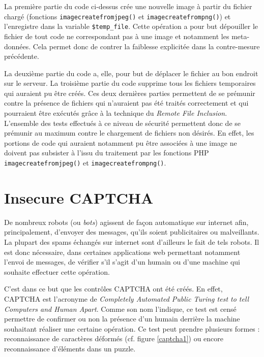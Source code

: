 La première partie du code ci-dessus crée une nouvelle image à partir du fichier chargé (fonctions \texttt{imagecreatefromjpeg()} et \texttt{imagecreatefrompng()}) et l'enregistre dans la variable \texttt{\$temp\_file}. Cette opération a pour but dépouiller le fichier de tout code ne correspondant pas à une image et notamment les meta-données. Cela permet donc de contrer la faiblesse explicitée dans la contre-mesure précédente.

La deuxième partie du code a, elle, pour but de déplacer le fichier au bon endroit sur le serveur. La troisième partie du code supprime tous les fichiers temporaires qui auraient pu être créés. Ces deux dernières parties permettent de se prémunir contre la présence de fichiers qui n'auraient pas été traités correctement et qui pourraient être exécutés grâce à la technique du \textit{Remote File Inclusion}.\\

L'ensemble des tests effectués à ce niveau de sécurité permettent donc de se prémunir au maximum contre le chargement de fichiers non désirés. En effet, les portions de code qui auraient notamment pu être associées à une image ne doivent pas subsister à l'issu du traitement par les fonctions PHP \texttt{imagecreatefromjpeg()} et \texttt{imagecreatefrompng()}.

\clearpage

\newpage

\section{Insecure CAPTCHA}

De nombreux robots (ou \textit{bots}) agissent de façon automatique sur internet afin, principalement, d'envoyer des messages, qu'ils soient publicitaires ou malveillants. La plupart des spams échangés sur internet sont d'ailleurs le fait de tels robots. Il est donc nécessaire, dans certaines applications web permettant notamment l'envoi de messages, de vérifier s'il s'agit d'un humain ou d'une machine qui souhaite effectuer cette opération.

C'est dans ce but que les contrôles CAPTCHA ont été créés. En effet, CAPTCHA est l'acronyme de \textit{Completely Automated Public Turing test to tell Computers and Human Apart}. Comme son nom l'indique, ce test est censé permettre de confirmer ou non la présence d'un humain derrière la machine souhaitant réaliser une certaine opération. Ce test peut prendre plusieurs formes : reconnaissance de caractères déformés (cf. figure \ref{captcha1}) ou encore reconnaissance d'éléments dans un puzzle.

